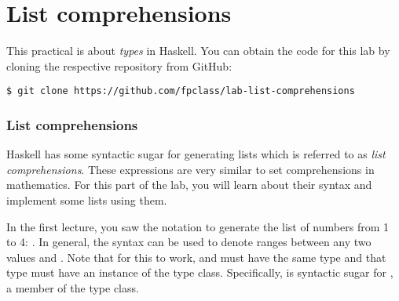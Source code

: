 \section{List comprehensions}

This practical is about \emph{types} in Haskell. You can obtain the code for this lab by cloning the respective repository from GitHub:
\begin{verbatim}
$ git clone https://github.com/fpclass/lab-list-comprehensions
\end{verbatim}

\subsubsection{List comprehensions}

Haskell has some syntactic sugar for generating lists which is referred to as \emph{list comprehensions}. These expressions are very similar to set comprehensions in mathematics. For this part of the lab, you will learn about their syntax and implement some lists using them.

In the first lecture, you saw the \haskellIn{[1..4]} notation to generate the list of numbers from 1 to 4: \haskellIn{[1,2,3,4]}. In general, the \haskellIn{[n..m]} syntax can be used to denote ranges between any two values  and . Note that for this to work,  and  must have the same type and that type must have an instance of the  type class. Specifically, \haskellIn{[n..m]} is syntactic sugar for , a member of the  type class.

\taskLine


\taskLine


\taskLine


